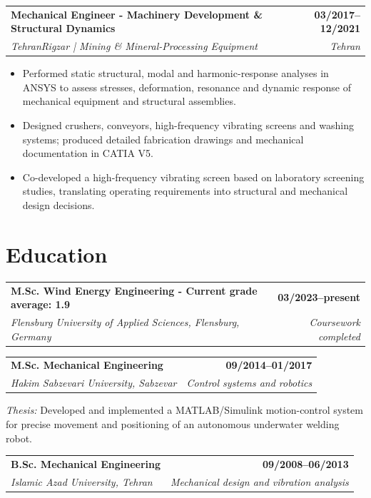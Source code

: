\documentclass[10pt,a4paper]{article}
\makeatletter
\newcommand{\cvjob}[4]{%
  \begin{tabularx}{\linewidth}{@{}Xr@{}}
    \textbf{#1} & \textbf{#2}\\[1pt]
    \textit{#3} & \textit{#4}
  \end{tabularx}
  \vspace{0.05em}
}
\newcommand{\cvedu}[4]{%
  \begin{tabularx}{\linewidth}{@{}Xr@{}}
    \textbf{#1} & \textbf{#2}\\[1pt]
    \textit{#3} & \textit{#4}
  \end{tabularx}
  \vspace{0.03em}
}
\makeatother
\begin{document}
\cvjob{Mechanical Engineer - Machinery Development \& Structural Dynamics}{03/2017--12/2021}{TehranRigzar | Mining \& Mineral-Processing Equipment}{Tehran}
\begin{itemize}
  \item Performed static structural, modal and harmonic-response analyses in ANSYS to assess stresses, deformation, resonance and dynamic response of mechanical equipment and structural assemblies.
  \item Designed crushers, conveyors, high-frequency vibrating screens and washing systems; produced detailed fabrication drawings and mechanical documentation in CATIA V5.
  \item Co-developed a high-frequency vibrating screen based on laboratory screening studies, translating operating requirements into structural and mechanical design decisions.
\end{itemize}
\vspace{1pt}

\section{Education}
\cvedu
  {M.Sc. Wind Energy Engineering - Current grade average: 1.9}
  {03/2023--present}
  {Flensburg University of Applied Sciences, Flensburg, Germany}
  {Coursework completed}

\vspace{1.0mm}

\cvedu
  {M.Sc. Mechanical Engineering}
  {09/2014--01/2017}
  {Hakim Sabzevari University, Sabzevar}
  {Control systems and robotics}

\vspace{0.5mm}
\textit{Thesis:} Developed and implemented a MATLAB/Simulink motion-control system for precise movement and positioning of an autonomous underwater welding robot.

\vspace{1.0mm}

\cvedu
  {B.Sc. Mechanical Engineering}
  {09/2008--06/2013}
  {Islamic Azad University, Tehran}
  {Mechanical design and vibration analysis}
\end{document}
